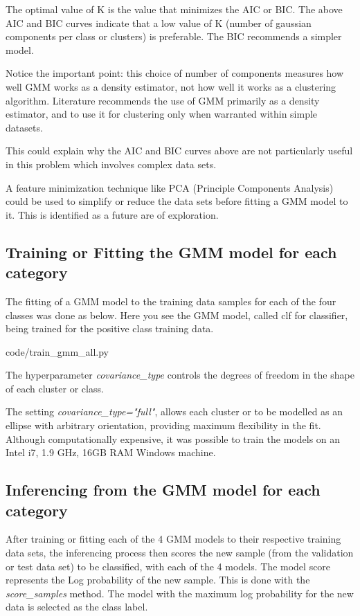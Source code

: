 \documentclass[a4paper,twoside,12pt]{report}
\begin{document}
The optimal value of K is the value that minimizes the AIC or BIC. The above AIC and BIC curves indicate that a low value of K (number of gaussian components per class or clusters) is preferable. The BIC recommends a simpler model.

Notice the important point: this choice of number of components measures how well GMM works as a density estimator, not how well it works as a clustering algorithm.   Literature\cite{jake} recommends the use of GMM primarily as a density estimator, and to use it for clustering only when warranted within simple datasets.  

This could explain why the AIC and BIC curves above are not particularly useful in this problem which involves complex data sets. 

A feature minimization technique like PCA (Principle Components Analysis) could be used to simplify or reduce the data sets before fitting a GMM model to it.   This is identified as a future are of exploration. 

\subsection {Training or Fitting the GMM model for each category}

The fitting of a GMM model to the training data samples for each of the four classes was done as below.  
Here you see the GMM model, called clf for classifier, being trained for the positive class training data.    


{code/train_gmm_all.py}

The hyperparameter \emph{covariance\_type}  controls the degrees of freedom in the shape of each cluster or class.  

The setting \emph{covariance\_type="full"}, allows each cluster or to be modelled as an ellipse with arbitrary orientation, providing maximum flexibility in the fit.    Although computationally expensive, it was possible to train the models on an Intel i7, 1.9 GHz, 16GB RAM Windows machine. 

\subsection {Inferencing from the GMM model for each category}
After training or fitting each of the 4 GMM models to their respective training data sets, the inferencing process then scores the new sample (from the validation or test data set) to be classified, with each of the 4 models.    The model score represents the Log probability of the new sample.  This is done with the \emph{score\_samples} method.   The model with the maximum log probability for the new data is selected as the class label. 
\end{document}
